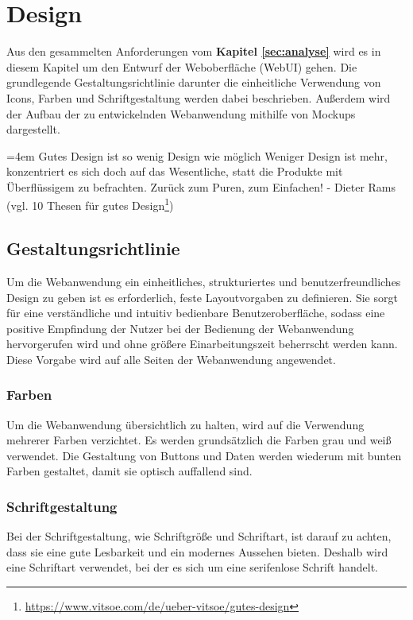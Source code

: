 \chapter{Design}
\label{sec:design}
Aus den gesammelten Anforderungen vom \textbf{Kapitel \ref{sec:analyse}} wird es in diesem Kapitel um den Entwurf der Weboberfläche (WebUI) gehen. Die grundlegende Gestaltungsrichtlinie darunter die einheitliche Verwendung von Icons, Farben und Schriftgestaltung werden dabei beschrieben. Außerdem wird der Aufbau der zu entwickelnden Webanwendung mithilfe von Mockups dargestellt.\bigskip

\par
\begingroup
\leftskip=4em %
\rightskip\leftskip
\noindent \glqq Gutes Design ist so wenig Design wie möglich
Weniger Design ist mehr, konzentriert es sich doch auf das Wesentliche, statt die Produkte mit Überflüssigem zu befrachten. Zurück zum Puren, zum Einfachen!\grqq{} - Dieter Rams (vgl. 10 Thesen für gutes Design\footnote{\url{https://www.vitsoe.com/de/ueber-vitsoe/gutes-design}})
\par
\endgroup
\bigskip

\section{Gestaltungsrichtlinie}
\label{sec:gestaltungsrichtlinie}
Um die Webanwendung ein einheitliches, strukturiertes und benutzerfreundliches Design zu geben ist es erforderlich, feste Layoutvorgaben zu definieren. Sie sorgt für eine verständliche und intuitiv bedienbare Benutzeroberfläche, sodass eine positive Empfindung der Nutzer bei der Bedienung der Webanwendung hervorgerufen wird und ohne größere Einarbeitungszeit beherrscht werden kann. Diese Vorgabe wird auf alle Seiten der Webanwendung angewendet.

\subsection{Farben}
\label{subsec:farben}
Um die Webanwendung übersichtlich zu halten, wird auf die Verwendung mehrerer Farben verzichtet. Es werden grundsätzlich die Farben grau und weiß verwendet. Die Gestaltung von Buttons und Daten werden wiederum mit bunten Farben gestaltet, damit sie optisch auffallend sind.

\subsection{Schriftgestaltung}
\label{subsec:schriftgestaltung}
Bei der Schriftgestaltung, wie Schriftgröße und Schriftart, ist darauf zu achten, dass sie eine gute Lesbarkeit und ein modernes Aussehen bieten. Deshalb wird eine Schriftart verwendet, bei der es sich um eine serifenlose Schrift handelt.

